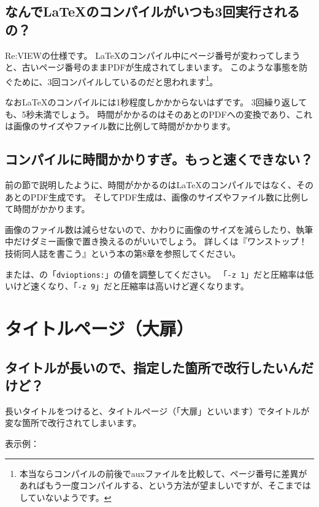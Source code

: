 \subsection{なんで\LaTeX{}のコンパイルがいつも3回実行されるの？}
\label{sec:2-5-1}

Re:VIEWの仕様です。
\LaTeX{}のコンパイル中にページ番号が変わってしまうと、古いページ番号のままPDFが生成されてしまいます。
このような事態を防ぐために、3回コンパイルしているのだと思われます\footnote{本当ならコンパイルの前後でauxファイルを比較して、ページ番号に差異があればもう一度コンパイルする、という方法が望ましいですが、そこまではしていないようです。}。

なお\LaTeX{}のコンパイルには1秒程度しかかからないはずです。
3回繰り返しても、5秒未満でしょう。
時間がかかるのはそのあとのPDFへの変換であり、これは画像のサイズやファイル数に比例して時間がかかります。

\subsection{コンパイルに時間かかりすぎ。もっと速くできない？}
\label{sec:2-5-2}

前の節で説明したように、時間がかかるのは\LaTeX{}のコンパイルではなく、そのあとのPDF生成です。
そしてPDF生成は、画像のサイズやファイル数に比例して時間がかかります。

画像のファイル数は減らせないので、かわりに画像のサイズを減らしたり、執筆中だけダミー画像で置き換えるのがいいでしょう。
詳しくは『ワンストップ！技術同人誌を書こう』という本の第8章を参照してください。

または、の「\texttt{dvioptions:}」の値を調整してください。
「\texttt{{-}z 1}」だと圧縮率は低いけど速くなり、「\texttt{{-}z 9}」だと圧縮率は高いけど遅くなります。

\section{タイトルページ（大扉）}
\label{sec:2-6}

\subsection{タイトルが長いので、指定した箇所で改行したいんだけど？}
\label{sec:2-6-1}

長いタイトルをつけると、タイトルページ（「大扉」といいます）でタイトルが変な箇所で改行されてしまいます。

表示例：

